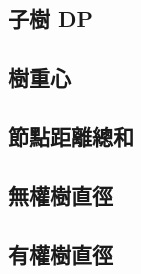 \subsection{子樹 DP} 

\subsection{樹重心} 

\subsection{節點距離總和}

\subsection{無權樹直徑} 

\subsection{有權樹直徑} 

